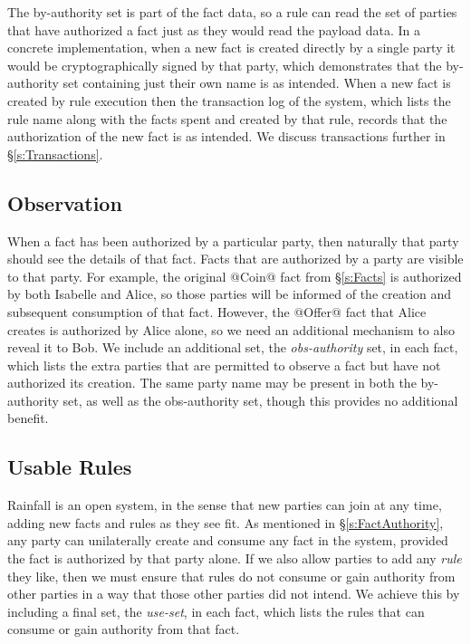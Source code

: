 The by-authority set is part of the fact data, so a rule can read the set of parties that have authorized a fact just as they would read the payload data. In a concrete implementation, when a new fact is created directly by a single party it would be cryptographically signed by that party, which demonstrates that the by-authority set containing just their own name is as intended. When a new fact is created by rule execution then the transaction log of the system, which lists the rule name along with the facts spent and created by that rule, records that the authorization of the new fact is as intended. We discuss transactions further in \S\ref{s:Transactions}.


\subsection{Observation}
\label{s:Observation}
When a fact has been authorized by a particular party, then naturally that party should see the details of that fact. Facts that are authorized by a party are visible to that party. For example, the original @Coin@ fact from \S\ref{s:Facts} is authorized by both Isabelle and Alice, so those parties will be informed of the creation and subsequent consumption of that fact. However, the @Offer@ fact that Alice creates is authorized by Alice alone, so we need an additional mechanism to also reveal it to Bob. We include an additional set, the \emph{obs-authority} set, in each fact, which lists the extra parties that are permitted to observe a fact but have not authorized its creation. The same party name may be present in both the by-authority set, as well as the obs-authority set, though this provides no additional benefit.


\subsection{Usable Rules}
Rainfall is an open system, in the sense that new parties can join at any time, adding new facts and rules as they see fit. As mentioned in \S\ref{s:FactAuthority}, any party can unilaterally create and consume any fact in the system, provided the fact is authorized by that party alone. If we also allow parties to add any \emph{rule} they like, then we must ensure that rules do not consume or gain authority from other parties in a way that those other parties did not intend. We achieve this by including a final set, the \emph{use-set}, in each fact, which lists the rules that can consume or gain authority from that fact.

